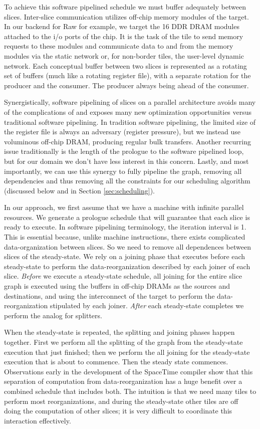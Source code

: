 To achieve this software pipelined schedule we must buffer adequately
between slices.  Inter-slice communication utilizes off-chip memory
modules of the target.  In our backend for Raw for example, we target
the 16 DDR DRAM modules attached to the i/o ports of the chip.  It is
the task of the tile to send memory requests to these modules and
communicate data to and from the memory modules via the static network
or, for non-border tiles, the user-level dynamic network.  Each
conceptual buffer between two slices is represented as a rotating set
of buffers (much like a rotating register file), with a separate
rotation for the producer and the consumer.  The producer
always being ahead of the consumer.

Synergistically, software pipelining of slices on a parallel architecture
avoids many of the complications of and exposes many new optimization
opportunities versus traditional software pipelining.  In tradition
software pipelining, the limited size of the register file is always
an adversary (register pressure), but we instead use voluminous
off-chip DRAM, producing regular bulk transfers.  Another recurring
issue traditionally is the length of the prologue to the software
pipelined loop, but for our domain we don't have less interest in this
concern.  Lastly, and most importantly, we can use this synergy to
fully pipeline the graph, removing all dependencies and thus removing
all the constraints for our scheduling algorithm (discussed below and
in Section \ref{sec:scheduling}).

In our approach, we first assume that we have a machine with infinite
parallel resources.  We generate a prologue schedule that will
guarantee that each slice is ready to execute.  In software pipelining
terminology, the iteration interval is 1.  This is essential because,
unlike machine instructions, there exists complicated
data-organization between slices.  So we need to remove all
dependences between slices of the steady-state.  We rely on a joining
phase that executes before each steady-state to perform the
data-reorganization described by each joiner of each slice.  {\it
Before} we execute a steady-state schedule, all joining for the entire
slice graph is executed using the buffers in off-chip DRAMs as the
sources and destinations, and using the interconnect of the target to
perform the data-reorganization stipulated by each joiner.  {\it
After} each steady-state completes we perform the analog for
splitters.  

When the steady-state is repeated, the splitting and joining phases
happen together.  First we perform all the splitting of the graph from
the steady-state execution that just finished; then we perform the all
joining for the steady-state execution that is about to commence.
Then the steady state commences.  Observations early in the
development of the SpaceTime compiler show that this separation of
computation from data-reorganization has a huge benefit over a
combined schedule that includes both.  The intuition is that we need
many tiles to perform most reorganizations, and during the
steady-state other tiles are off doing the computation of other
slices; it is very difficult to coordinate this interaction
effectively.  

